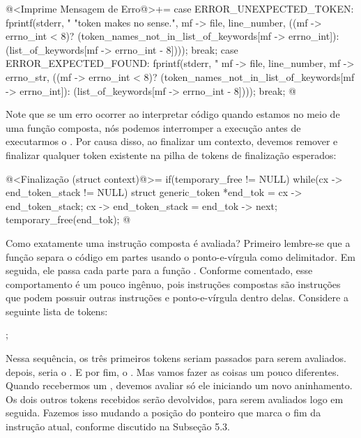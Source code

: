 \iniciocodigo
@<Imprime Mensagem de Erro@>+=
case ERROR_UNEXPECTED_TOKEN:
  fprintf(stderr, "%
          "token makes no sense.", mf -> file, line_number,
          ((mf -> errno_int < 8)?
          (token_names_not_in_list_of_keywords[mf -> errno_int]):
          (list_of_keywords[mf -> errno_int - 8])));
  break;
case ERROR_EXPECTED_FOUND:
  fprintf(stderr, "%
          mf -> file, line_number, mf -> errno_str,
          ((mf -> errno_int < 8)?
          (token_names_not_in_list_of_keywords[mf -> errno_int]):
          (list_of_keywords[mf -> errno_int - 8])));
  break;
@
\fimcodigo

Note que se um erro ocorrer ao interpretar código quando estamos no
meio de uma função composta, nós podemos interromper a execução antes
de executarmos o . Por causa disso, ao
finalizar um contexto, devemos remover e finalizar qualquer token
existente na pilha de tokens de finalização esperados:

\iniciocodigo
@<Finalização (struct context)@>=
if(temporary_free != NULL){
  while(cx -> end_token_stack != NULL){
    struct generic_token *end_tok = cx -> end_token_stack;
    cx -> end_token_stack = end_tok -> next;
    temporary_free(end_tok);
  }  
}
@
\fimcodigo


Como exatamente uma instrução composta é avaliada? Primeiro lembre-se
que a função  separa o código
em partes usando o ponto-e-vírgula como delimitador. Em seguida, ele
passa cada parte para a função . Conforme
comentado, esse comportamento é um pouco ingênuo, pois instruções
compostas são instruções que podem possuir outras instruções e
ponto-e-vírgula dentro delas. Considere a seguinte lista
de tokens:

\alinhaverbatim
[begingroup][T1][T2][;][T3][T4][;][endgroup][T5];
\alinhanormal

Nessa sequência, os três primeiros tokens seriam passados para serem
avaliados. depois, seria o \monoespaco{[T3][T4]}. E por fim,
o \monoespaco{[endgroup]}. Mas vamos fazer as coisas um pouco
diferentes. Quando recebermos um \monoespaco{[begingroup][T5]},
devemos avaliar só ele iniciando um novo aninhamento. Os dois outros
tokens recebidos serão devolvidos, para serem avaliados logo em
seguida. Fazemos isso mudando a posição do ponteiro que marca o fim da
instrução atual, conforme discutido na Subseção 5.3.

